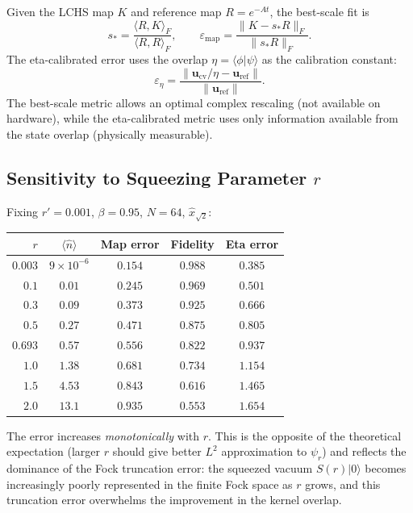 \documentclass[11pt]{article}
\begin{document}
Given the LCHS map $K$ and reference map $R = e^{-At}$, the best-scale fit is
\begin{equation}
  s_* = \frac{\langle R, K\rangle_F}{\langle R, R\rangle_F},
  \qquad
  \varepsilon_{\text{map}} = \frac{\|K - s_* R\|_F}{\|s_* R\|_F}.
\end{equation}
The eta-calibrated error uses the overlap $\eta = \langle\phi|\psi\rangle$
as the calibration constant:
\begin{equation}
  \varepsilon_{\eta} = \frac{\|\mathbf{u}_{\text{cv}}/\eta - \mathbf{u}_{\text{ref}}\|}
                            {\|\mathbf{u}_{\text{ref}}\|}.
\end{equation}
The best-scale metric allows an optimal complex rescaling (not available on
hardware), while the eta-calibrated metric uses only information available
from the state overlap (physically measurable).

\subsection{Sensitivity to Squeezing Parameter $r$}

Fixing $r' = 0.001$, $\beta = 0.95$, $N = 64$, $\hat{x}_{\sqrt{2}}$:

\begin{center}
\begin{tabular}{rcccc}
  \toprule
  $r$ & $\langle\hat{n}\rangle$ & Map error & Fidelity & Eta error \\
  \midrule
  $0.003$ & $9\times10^{-6}$ & $\mathbf{0.154}$ & $\mathbf{0.988}$ & $0.385$ \\
  $0.1$ & $0.01$ & $0.245$ & $0.969$ & $0.501$ \\
  $0.3$ & $0.09$ & $0.373$ & $0.925$ & $0.666$ \\
  $0.5$ & $0.27$ & $0.471$ & $0.875$ & $0.805$ \\
  $0.693$ & $0.57$ & $0.556$ & $0.822$ & $0.937$ \\
  $1.0$ & $1.38$ & $0.681$ & $0.734$ & $1.154$ \\
  $1.5$ & $4.53$ & $0.843$ & $0.616$ & $1.465$ \\
  $2.0$ & $13.1$ & $0.935$ & $0.553$ & $1.654$ \\
  \bottomrule
\end{tabular}
\end{center}

The error increases \emph{monotonically} with $r$.  This is the opposite of
the theoretical expectation (larger $r$ should give better $L^2$ approximation
to $\psi_r$) and reflects the dominance of the Fock truncation error:
the squeezed vacuum $S(r)|0\rangle$ becomes increasingly poorly represented
in the finite Fock space as $r$ grows, and this truncation error overwhelms
the improvement in the kernel overlap.
\end{document}
